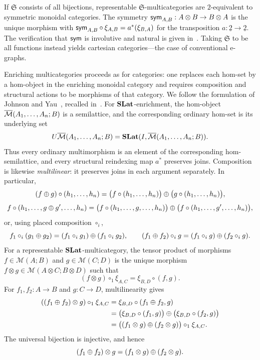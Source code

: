 \begin{example}
\label{ex:symmetric_S_multicategory}
    If $\mathfrak{S}$ consists of all bijections, representable $\mathfrak{S}$-multicategories are $2$-equivalent to symmetric monoidal categories.
    The symmetry $\textsf{sym}_{A,B} : A \otimes B \to B \otimes A$ is the unique morphism with $\textsf{sym}_{A,B} \circ \xi_{A,B} = a^*(\xi_{B,A})$ for the transposition $a : \underline{2} \to \underline{2}$.
    The verification that $\textsf{sym}$ is involutive and natural is given in~.
    Taking $\mathfrak{S}$ to be all functions instead yields cartesian categories---the case of conventional e-graphs.
\end{example}

Enriching multicategories proceeds as for categories: one replaces each hom-set by a hom-object in the enriching monoidal category and requires composition and structural actions to be morphisms of that category.
We follow the formulation of Johnson and Yau~\cite{johnson2023homotopytheoryenrichedmackey}, recalled in~.
For $\mathbf{SLat}$-enrichment, the hom-object ${\overline{\mathcal{M}}}(A_1,\ldots,A_n;B)$ is a semilattice, and the corresponding ordinary hom-set is its underlying set
\[
U{\overline{\mathcal{M}}}(A_1,\ldots,A_n;B)
=\mathbf{SLat}(I,{\overline{\mathcal{M}}}(A_1,\ldots,A_n;B)).
\]
Thus every ordinary multimorphism is an element of the corresponding hom-semilattice, and every structural reindexing map $a^*$ preserves joins.
Composition is likewise \emph{multilinear}: it preserves joins in each argument separately.
In particular,
\[
 (f \mathbin{\oplus} g) \circ (h_1,\ldots,h_n)
 = \bigl(f \circ (h_1,\ldots,h_n)\bigr)
   \mathbin{\oplus} \bigl(g \circ (h_1,\ldots,h_n)\bigr),
\]
\[
f \circ (h_1, \ldots, g \mathbin{\oplus} g', \ldots, h_n)
= \bigl(f \circ (h_1, \ldots, g, \ldots, h_n)\bigr)
  \mathbin{\oplus} \bigl(f \circ (h_1, \ldots, g', \ldots, h_n)\bigr),
\]
or, using placed composition $\circ_i$,
\[
f_1 \circ_i (g_1 \mathbin{\oplus} g_2)
= (f_1 \circ_i g_1) \mathbin{\oplus} (f_1 \circ_i g_2),
\qquad
(f_1 \mathbin{\oplus} f_2) \circ_i g
= (f_1 \circ_i g) \mathbin{\oplus} (f_2 \circ_i g).
\]
For a representable $\mathbf{SLat}$-multicategory, the tensor product of morphisms $f \in \mathcal{M}(A; B)$ and $g \in \mathcal{M}(C; D)$ is the unique morphism $f \otimes g \in \mathcal{M}(A \otimes C; B \otimes D)$ such that
\[
(f \otimes g) \circ_1 \xi_{A,C} = \xi_{B,D} \circ (f,g).
\]
For $f_1,f_2:A\to B$ and $g:C\to D$, multilinearity gives
\begin{align*}
((f_1 \mathbin{\oplus} f_2) \otimes g) \circ_1 \xi_{A,C}
 &= \xi_{B,D} \circ (f_1 \mathbin{\oplus} f_2,g)\\
 &= \bigl(\xi_{B,D} \circ (f_1,g)\bigr)
      \mathbin{\oplus} \bigl(\xi_{B,D} \circ (f_2,g)\bigr)\\
 &= \bigl((f_1\otimes g)\mathbin{\oplus}(f_2\otimes g)\bigr)\circ_1\xi_{A,C}.
\end{align*}
The universal bijection is injective, and hence
\[
(f_1\mathbin{\oplus} f_2)\otimes g=(f_1\otimes g)\mathbin{\oplus}(f_2\otimes g).
\]

